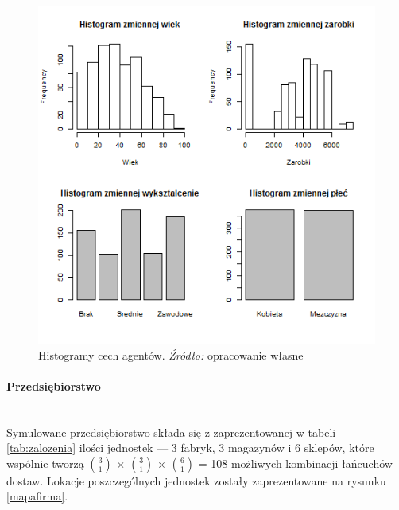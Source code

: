 \documentclass[polish, twoside, 12pt, a4paper]{article}
\theoremstyle{definition}
\theoremstyle{plain}
\theoremstyle{remark}
\begin{document}
\begin{figure}[hbt]
  \centering
    \includegraphics[width=\textwidth]{pictures/ludnosc.png}
  \captionsetup{margin=10pt,font=small,labelfont=bf,width=.8\textwidth}
  \caption[Krótka nazwa X]{Histogramy cech agentów. \textit{Źródło:} opracowanie własne}\label{ludnosc}
\end{figure}

\paragraph{Przedsiębiorstwo}\mbox{}\\
Symulowane przedsiębiorstwo składa się z zaprezentowanej w tabeli \ref{tab:zalozenia} ilości jednostek --- 3 fabryk, 3 magazynów i 6 sklepów, które wspólnie tworzą  $3\choose 1 $ $ \times $ $3\choose 1 $ $ \times $ $6\choose 1 $ = 108 możliwych kombinacji łańcuchów dostaw. Lokacje poszczególnych jednostek zostały zaprezentowane na rysunku \ref{mapafirma}.
\end{document}
